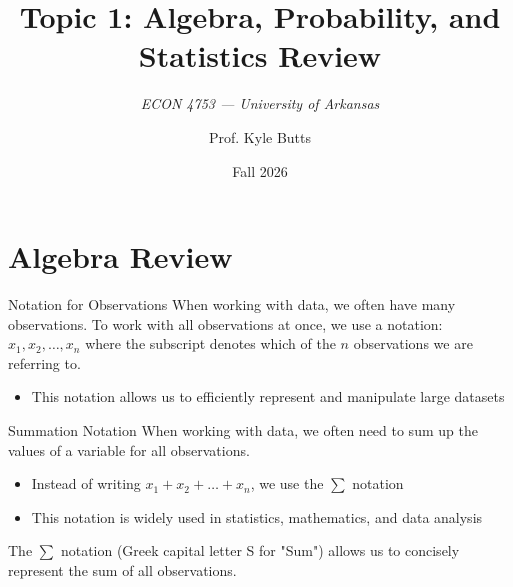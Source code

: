 \documentclass[aspectratio=169,t,11pt,table]{beamer}
\title{Topic 1: Algebra, Probability, and Statistics Review}
\subtitle{\it ECON 4753 — University of Arkansas}
\date{Fall 2026}
\author{Prof. Kyle Butts}
\begin{document}
\begin{frame}
  \maketitle

\end{frame}

\section{Algebra Review}

\begin{frame}{Notation for Observations}
  When working with data, we often have many observations. To work with all observations at once, we use a notation: 
  $x_1, x_2, \dots, x_n$
  where the subscript denotes which of the $n$ observations we are referring to.
  \begin{itemize}
    \item This notation allows us to efficiently represent and manipulate large datasets
  \end{itemize}
\end{frame}

\begin{frame}{Summation Notation}
  When working with data, we often need to sum up the values of a variable for all observations.
  \begin{itemize}
    \item Instead of writing $x_1 + x_2 + \dots + x_n$, we use the $\sum$ notation
    \item This notation is widely used in statistics, mathematics, and data analysis
  \end{itemize}
  
  \bigskip
  The $\sum$ notation (Greek capital letter S for "Sum") allows us to concisely represent the sum of all observations. 
\end{frame}
\end{document}

